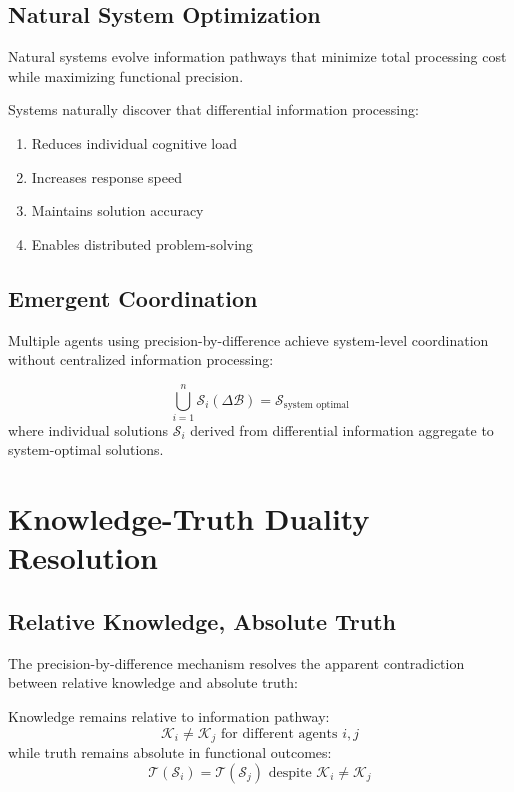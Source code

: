 \documentclass{article}
\begin{document}
\subsection{Natural System Optimization}
\begin{theorem}
Natural systems evolve information pathways that minimize total processing cost while maximizing functional precision.
\end{theorem}

Systems naturally discover that differential information processing:
\begin{enumerate}
    \item Reduces individual cognitive load
    \item Increases response speed
    \item Maintains solution accuracy
    \item Enables distributed problem-solving
\end{enumerate}

\subsection{Emergent Coordination}
Multiple agents using precision-by-difference achieve system-level coordination without centralized information processing:

\begin{corollary}
$$\bigcup_{i=1}^{n} \mathcal{S}_i(\Delta \mathcal{B}) = \mathcal{S}_{\text{system optimal}}$$
where individual solutions $\mathcal{S}_i$ derived from differential information aggregate to system-optimal solutions.
\end{corollary}

\section{Knowledge-Truth Duality Resolution}

\subsection{Relative Knowledge, Absolute Truth}
The precision-by-difference mechanism resolves the apparent contradiction between relative knowledge and absolute truth:

\begin{theorem}
Knowledge remains relative to information pathway:
$$\mathcal{K}_i \neq \mathcal{K}_j \text{ for different agents } i, j$$
while truth remains absolute in functional outcomes:
$$\mathcal{T}(\mathcal{S}_i) = \mathcal{T}(\mathcal{S}_j) \text{ despite } \mathcal{K}_i \neq \mathcal{K}_j$$
\end{theorem}
\end{document}
